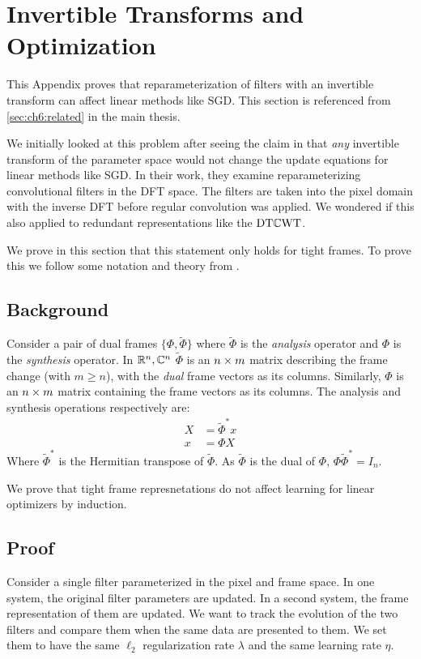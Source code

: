 \chapter{Invertible Transforms and Optimization} \label{appC:invertible}
\def \path {freqlearn/}
\def \imgpath {freqlearn/images}

This Appendix proves that reparameterization of filters with an invertible
transform can affect linear methods like SGD. This section is referenced from 
\autoref{sec:ch6:related} in the main thesis.

We initially looked at this problem after seeing the claim in
\cite{rippel_spectral_2015} that \emph{any} invertible transform of the parameter
space would not change the update equations for linear methods like SGD. In
their work, they examine reparameterizing convolutional filters in the DFT
space. The filters are taken into the pixel domain with the inverse DFT before
regular convolution was applied. We wondered if this also applied to redundant
representations like the $\DTCWT$.

We prove in this section that this statement only holds for tight frames.
To prove this we follow some notation and theory from 
\cite{kovacevic_introduction_2008}.

\section{Background}
Consider a pair of dual frames $\{\Phi, \tilde{\Phi}\}$ where $\tilde{\Phi}$ is
the \emph{analysis} operator and $\Phi$ is the \emph{synthesis} operator. 
In $\reals[n], \complexes[n]$ $\tilde{\Phi}$ is an $n\x m$ matrix describing the
frame change (with $m \geq n$), with the \emph{dual} frame vectors as its columns.
Similarly, $\Phi$ is an $n\x m$ matrix containing the frame vectors as its
columns. The analysis and synthesis operations respectively are:
\begin{align}
  X &= \tilde{\Phi}^* x \label{eq:appC:analysis}\\
  x &= \Phi X \label{eq:appC:synthesis}
\end{align}
Where $\tilde{\Phi}^*$ is the Hermitian transpose of $\tilde{\Phi}$. As
$\tilde{\Phi}$ is the dual of $\Phi$, $\Phi \tilde{\Phi}^* = I_n$.

We prove that tight frame represnetations do not affect learning for linear optimizers by
induction.

\section{Proof}
Consider a single filter parameterized in the pixel and frame space. In one
system, the original filter parameters are updated. In a second system, the
frame representation of them are updated. We want to track the evolution of the
two filters and compare them when the same data are presented to them. We set them to have the same
$\ell_2$ regularization rate $\lambda$ and the same learning rate $\eta$.

